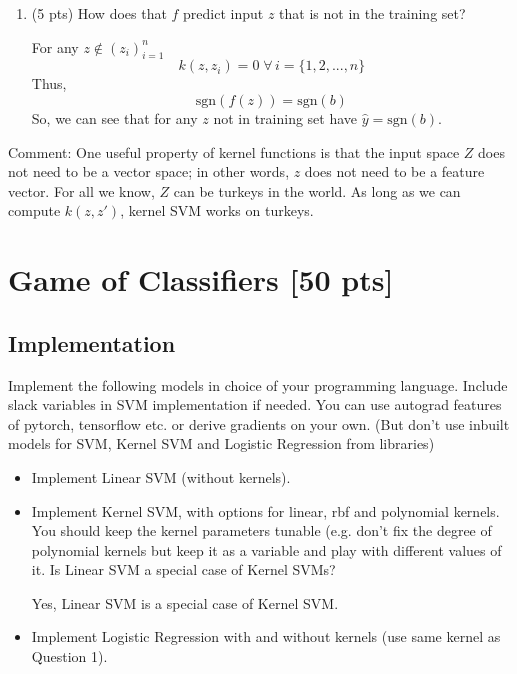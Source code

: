 \documentclass[a4paper]{article}
\theoremstyle{definition}
\newcommand{\sgn}{\mathrm{sgn}}
\newenvironment{soln}{
    \leavevmode\color{blue}\ignorespaces
}{}
\begin{document}
\begin{enumerate}
\item (5 pts) How does that $f$ predict input $z$ that is not in the training set?

\begin{soln}
    For any $z \notin {(z_i)}_{i=1}^n$
    $$
        k(z,z_i)=0\;\forall\,i=\{1,2,...,n\}
    $$
    Thus,
    $$
        \sgn(f(z)) = \sgn(b)
    $$
    So, we can see that for any $z$ not in training set have $\hat{y}=\sgn(b)$.
\end{soln}

\end{enumerate}

Comment: One useful property of kernel functions is that the input space $Z$ does not need to be a vector space; in other words, $z$ does not need to be a feature vector.  For all we know, $Z$ can be turkeys in the world.  As long as we can compute $k(z,z')$, kernel SVM works on turkeys.

\section{Game of Classifiers [50 pts]}
 \subsection{Implementation}
  Implement the following models in choice of your programming language. Include slack variables in SVM implementation if needed. You can use autograd features of pytorch, tensorflow etc. or derive gradients on your own. (But don't use inbuilt models for SVM, Kernel SVM and Logistic Regression from libraries)
  
  \begin{itemize}
      \item Implement Linear SVM (without kernels). 
      \item Implement Kernel SVM, with options for linear, rbf and polynomial kernels. You should keep the kernel parameters tunable (e.g. don't fix the degree of polynomial kernels but keep it as a variable and play with different values of it. Is Linear SVM a special case of Kernel SVMs?
      
      \begin{soln}
          Yes, Linear SVM is a special case of Kernel SVM.
      \end{soln}
      \item Implement Logistic Regression with and without kernels (use same kernel as Question 1).
      
  \end{itemize}
\end{document}

